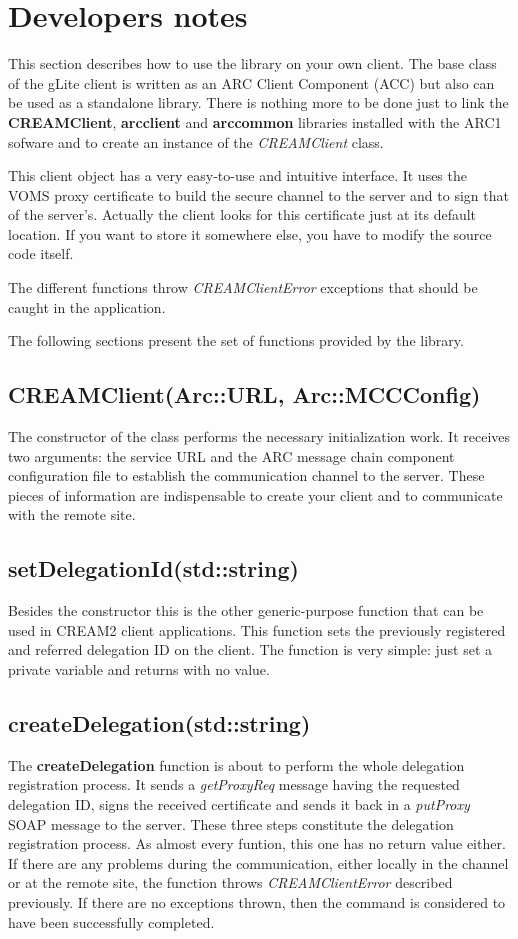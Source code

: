 \documentclass{article}
\begin{document}
\section{Developers notes}
\label{Developers notes}
This section describes how to use the library on your own client. The base class of the gLite client is written as an ARC Client Component (ACC) but also can be used as a standalone library. There is nothing more to be done just to link the \textbf{CREAMClient}, \textbf{arcclient} and \textbf{arccommon} libraries installed with the ARC1 sofware and to create an instance of the \textit{CREAMClient} class.\par
This client object has a very easy-to-use and intuitive interface. It uses the VOMS proxy certificate to build the secure channel to the server and to sign that of the server's. Actually the client looks for this certificate just at its default location. If you want to store it somewhere else, you have to modify the source code itself.\par
The different functions throw \textit{CREAMClientError} exceptions that should be caught in the application.\par
The following sections present the set of functions provided by the library.
\subsection{CREAMClient(Arc::URL, Arc::MCCConfig)}
The constructor of the class performs the necessary initialization work. It receives two arguments: the service URL and the ARC message chain component configuration file to establish the communication channel to the server. These pieces of information are indispensable to create your client and to communicate with the remote site.
\subsection{setDelegationId(std::string)}
Besides the constructor this is the other generic-purpose function that can be used in CREAM2 client applications. This function sets the previously registered and referred delegation ID on the client. The function is very simple: just set a private variable and returns with no value.
\subsection{createDelegation(std::string)}
The \textbf{createDelegation} function is about to perform the whole delegation registration process. It sends a \textit{getProxyReq} message having the requested delegation ID, signs the received certificate and sends it back in a \textit{putProxy} SOAP message to the server. These three steps constitute the delegation registration process.
As almost every funtion, this one has no return value either. If there are any problems during the communication, either locally in the channel or at the remote site, the function throws \textit{CREAMClientError} described previously. If there are no exceptions thrown, then the command is considered to have been successfully completed.
\end{document}
